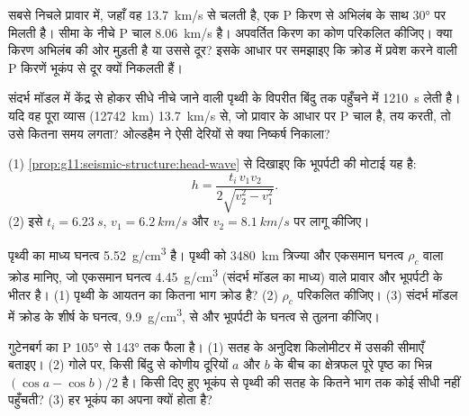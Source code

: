 \begin{exercise}[$\star\star$]\label{exo:g11:seismic-structure:10}
सबसे निचले प्रावार में, जहाँ वह \qty{13.7}{km/s} से चलती है, एक P किरण
 से अभिलंब के साथ \ang{30} पर मिलती है। सीमा के नीचे
P चाल \qty{8.06}{km/s} है। अपवर्तित किरण का कोण परिकलित कीजिए। क्या
किरण अभिलंब की ओर मुड़ती है या उससे दूर? इसके आधार पर समझाइए कि क्रोड में प्रवेश करने वाली P
किरणें भूकंप से दूर क्यों निकलती हैं।
\end{exercise}

\begin{exercise}[$\star\star$]\label{exo:g11:seismic-structure:11}
संदर्भ मॉडल में केंद्र से होकर सीधे नीचे जाने वाली  पृथ्वी के
विपरीत बिंदु तक पहुँचने में \qty{1210}{s} लेती है। यदि वह पूरा व्यास (\qty{12742}{km})
\qty{13.7}{km/s} से, जो प्रावार के आधार पर P चाल है, तय करती, तो उसे कितना समय लगता?
ओल्डहैम ने ऐसी देरियों से क्या निष्कर्ष निकाला?
\end{exercise}

\begin{exercise}[$\star\star\star$]\label{exo:g11:seismic-structure:12}
(1) \cref{prop:g11:seismic-structure:head-wave} से दिखाइए कि भूपर्पटी की मोटाई
यह है:
\[
  h = \frac{t_i\,v_1 v_2}{2\sqrt{v_2^2 - v_1^2}}.
\]
(2) इसे $t_i = \qty{6.23}{s}$, $v_1 = \qty{6.2}{km/s}$ और
$v_2 = \qty{8.1}{km/s}$ पर लागू कीजिए।
\end{exercise}

\begin{exercise}[$\star\star\star$]\label{exo:g11:seismic-structure:13}
पृथ्वी का माध्य घनत्व \qty{5.52}{g/cm^3} है। पृथ्वी को
\qty{3480}{km} त्रिज्या और एकसमान घनत्व $\rho_c$ वाला क्रोड मानिए, जो एकसमान घनत्व \qty{4.45}{g/cm^3}
(संदर्भ मॉडल का माध्य) वाले प्रावार और भूपर्पटी के भीतर है।
(1) पृथ्वी के आयतन का कितना भाग क्रोड है? (2)
$\rho_c$ परिकलित कीजिए। (3) संदर्भ मॉडल में क्रोड के शीर्ष के घनत्व,
\qty{9.9}{g/cm^3}, से और भूपर्पटी के घनत्व से तुलना कीजिए।
\end{exercise}

\begin{exercise}[$\star\star\star$]\label{exo:g11:seismic-structure:14}
गुटेनबर्ग का P  \ang{105} से \ang{143} तक फैला है। (1) सतह के अनुदिश
किलोमीटर में उसकी सीमाएँ बताइए। (2) गोले पर, किसी बिंदु से कोणीय दूरियों $a$ और $b$
के बीच का क्षेत्रफल पूरे पृष्ठ का भिन्न $(\cos a - \cos
b)/2$ है। किसी दिए हुए भूकंप से पृथ्वी की सतह के कितने भाग तक कोई
सीधी  नहीं पहुँचती? (3) हर भूकंप का अपना
 क्यों होता है?
\end{exercise}

